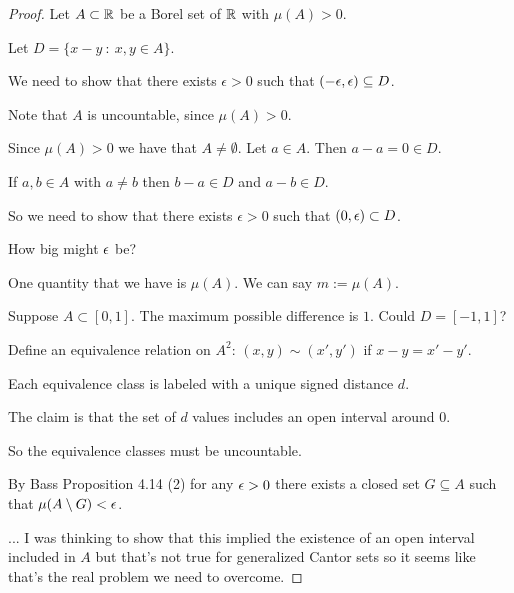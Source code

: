 \begin{proof}
  Let $A \subset \mathbb{R}$ be a Borel set of $\mathbb{R}$ with $\mu(A) > 0$.

  Let $D = \big\{ x - y ~:~ x, y \in A\big\}$.

  We need to show that there exists $\epsilon > 0$ such that $(-\epsilon, \epsilon) \subseteq D$.

  Note that $A$ is uncountable, since $\mu(A) > 0$.


  Since $\mu(A) > 0$ we have that $A \neq \emptyset$. Let $a \in A$. Then $a - a = 0 \in D$.

  If $a, b \in A$ with $a \neq b$ then $b - a \in D$ and $a - b \in D$.

  So we need to show that there exists $\epsilon > 0$ such that $(0, \epsilon) \subset D$.

  How big might $\epsilon$ be?

  One quantity that we have is $\mu(A)$. We can say $m := \mu(A)$.

  Suppose $A \subset [0, 1]$. The maximum possible difference is $1$. Could $D = [-1, 1]$?

  Define an equivalence relation on $A^2$: $(x, y) \sim (x', y')$ if $x - y = x' - y'$.

  Each equivalence class is labeled with a unique signed distance $d$.

  The claim is that the set of $d$ values includes an open interval around $0$.

  So the equivalence classes must be uncountable.

  By Bass Proposition 4.14 (2) for any $\epsilon > 0$ there exists a closed set $G \subseteq A$ such that $\mu(A \setminus G) < \epsilon$.

  ... I was thinking to show that this implied the existence of an open interval included in $A$ but that's not
  true for generalized Cantor sets so it seems like that's the real problem we need to overcome.
\end{proof}




























